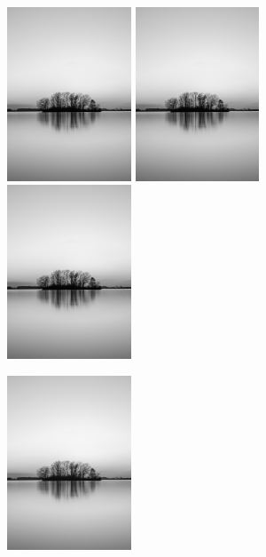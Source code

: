 \documentclass{article}
\begin{document}
{    \begin{figure}[htp]
        \begin{overprint}
            \includegraphics[width=0.33\textwidth]{Assignment-14/fig-0.jpg}
            \includegraphics[width=0.33\textwidth]{Assignment-14/fig-1.jpg}
            \includegraphics[width=0.33\textwidth]{Assignment-14/fig-2.jpg}
        \end{overprint}
        \begin{overprint}
            \includegraphics[width=0.33\textwidth]{Assignment-14/fig-3.jpg}

\end{overprint}
\end{figure}}
\end{document}
